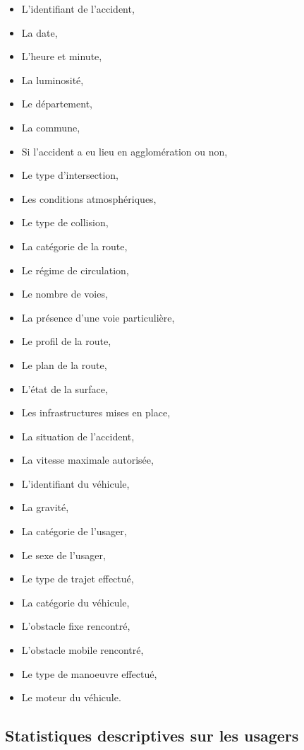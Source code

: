 \documentclass[french,]{tp}
\providecommand{\tightlist}{%
  \setlength{\itemsep}{0pt}\setlength{\parskip}{0pt}}
\begin{document}
\begin{itemize}
\tightlist
\item
  L'identifiant de l'accident,
\item
  La date,
\item
  L'heure et minute,
\item
  La luminosité,
\item
  Le département,
\item
  La commune,
\item
  Si l'accident a eu lieu en agglomération ou non,
\item
  Le type d'intersection,
\item
  Les conditions atmosphériques,
\item
  Le type de collision,
\item
  La catégorie de la route,
\item
  Le régime de circulation,
\item
  Le nombre de voies,
\item
  La présence d'une voie particulière,
\item
  Le profil de la route,
\item
  Le plan de la route,
\item
  L'état de la surface,
\item
  Les infrastructures mises en place,
\item
  La situation de l'accident,
\item
  La vitesse maximale autorisée,
\item
  L'identifiant du véhicule,
\item
  La gravité,
\item
  La catégorie de l'usager,
\item
  Le sexe de l'usager,
\item
  Le type de trajet effectué,
\item
  La catégorie du véhicule,
\item
  L'obstacle fixe rencontré,
\item
  L'obstacle mobile rencontré,
\item
  Le type de manoeuvre effectué,
\item
  Le moteur du véhicule.
\end{itemize}

\hypertarget{statistiques-descriptives-sur-les-usagers}{%
\subsection{Statistiques descriptives sur les usagers}\label{statistiques-descriptives-sur-les-usagers}}
\end{document}
